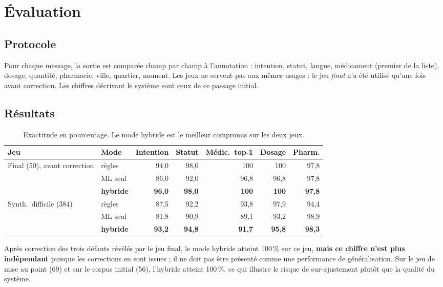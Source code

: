 \documentclass[11pt,a4paper]{article}
\begin{document}
\section{\'Evaluation}
\subsection{Protocole}
Pour chaque message, la sortie est compar\'ee champ par champ \`a l'annotation : intention, statut, langue, m\'edicament (premier de la liste), dosage, quantit\'e, pharmacie, ville, quartier, moment. Les jeux ne servent pas aux m\^emes usages : le jeu \emph{final} n'a \'et\'e utilis\'e qu'une fois avant correction. Les chiffres d\'ecrivant le syst\`eme sont ceux de ce passage initial.

\subsection{R\'esultats}
\begin{table}[htbp]\centering\small
\begin{tabular}{@{}llrrrrr@{}}\toprule
\textbf{Jeu} & \textbf{Mode} & \textbf{Intention} & \textbf{Statut} & \textbf{M\'edic.\ top-1} & \textbf{Dosage} & \textbf{Pharm.}\\\midrule
Final (50), avant correction & r\`egles & 94,0 & 98,0 & 100 & 100 & 97,8\\
 & ML seul & 86,0 & 92,0 & 96,8 & 96,8 & 97,8\\
 & \textbf{hybride} & \textbf{96,0} & \textbf{98,0} & \textbf{100} & \textbf{100} & \textbf{97,8}\\\midrule
Synth.\ difficile (384) & r\`egles & 87,5 & 92,2 & 93,8 & 97,9 & 94,4\\
 & ML seul & 81,8 & 90,9 & 89,1 & 93,2 & 98,9\\
 & \textbf{hybride} & \textbf{93,2} & \textbf{94,8} & \textbf{91,7} & \textbf{95,8} & \textbf{98,3}\\\bottomrule
\end{tabular}
\caption{Exactitude en pourcentage. Le mode hybride est le meilleur compromis sur les deux jeux.}
\end{table}

Apr\`es correction des trois d\'efauts r\'ev\'el\'es par le jeu final, le mode hybride atteint 100\,\% sur ce jeu, \textbf{mais ce chiffre n'est plus ind\'ependant} puisque les corrections en sont issues ; il ne doit pas \^etre pr\'esent\'e comme une performance de g\'en\'eralisation. Sur le jeu de mise au point (69) et sur le corpus initial (56), l'hybride atteint 100\,\%, ce qui illustre le risque de sur-ajustement plut\^ot que la qualit\'e du syst\`eme.
\end{document}
